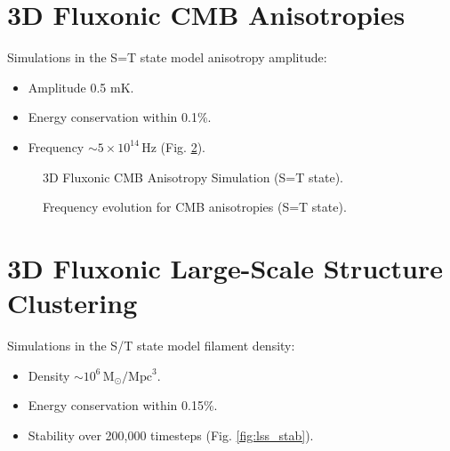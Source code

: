 \documentclass[11pt]{article}
\begin{document}
\section{3D Fluxonic CMB Anisotropies}
Simulations in the S=T state model anisotropy amplitude:
\begin{itemize}
    \item Amplitude 0.5 mK.
    \item Energy conservation within 0.1\%.
    \item Frequency \(\sim 5 \times 10^{14} \, \text{Hz}\) (Fig. \ref{fig:cmb_freq}).
\end{itemize}

\begin{figure}[ht]
    \centering
    \caption{3D Fluxonic CMB Anisotropy Simulation (S=T state).}
    \label{fig:3Dcmb}
\end{figure}

\begin{figure}[ht]
    \centering
    \caption{Frequency evolution for CMB anisotropies (S=T state).}
    \label{fig:cmb_freq}
\end{figure}

\section{3D Fluxonic Large-Scale Structure Clustering}
Simulations in the S/T state model filament density:
\begin{itemize}
    \item Density \(\sim 10^6 \, \text{M}_\odot/\text{Mpc}^3\).
    \item Energy conservation within 0.15\%.
    \item Stability over 200,000 timesteps (Fig. \ref{fig:lss_stab}).
\end{itemize}
\end{document}
